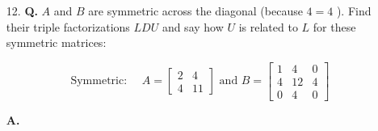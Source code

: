 \documentclass[main.tex]{subfiles}
\begin{document}
\begin{enumerate}
    \item [12.] \textbf{Q.} $A$ and $B$ are symmetric across the diagonal (because $4=4$ ). Find their triple factorizations $L D U$ and say how $U$ is related to $L$ for these symmetric matrices: 
    
    $$
    \text{Symmetric: } \quad 
    A=\left[\begin{array}{rr}
    2 & 4 \\
    4 & 11
    \end{array}\right] \text { and } B=\left[\begin{array}{rrr}
    1 & 4 & 0 \\
    4 & 12 & 4 \\
    0 & 4 & 0
    \end{array}\right]
    $$
    
    \textbf{A.}
    

\end{enumerate}
\end{document}
